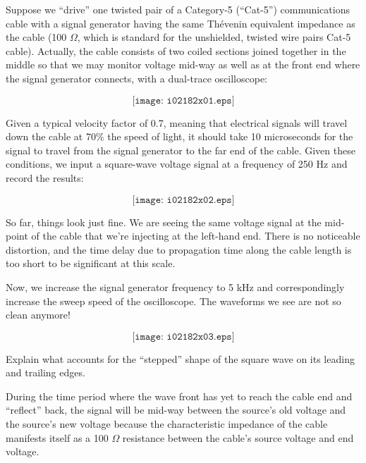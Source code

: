 

Suppose we ``drive'' one twisted pair of a Category-5 (``Cat-5'') communications cable with a signal generator having the same Th\'evenin equivalent impedance as the cable (100 $\Omega$, which is standard for the unshielded, twisted wire pairs Cat-5 cable).  Actually, the cable consists of two coiled sections joined together in the middle so that we may monitor voltage mid-way as well as at the front end where the signal generator connects, with a dual-trace oscilloscope:

$$\texttt{[image: i02182x01.eps]}$$

Given a typical velocity factor of 0.7, meaning that electrical signals will travel down the cable at 70\% the speed of light, it should take 10 microseconds for the signal to travel from the signal generator to the far end of the cable.  Given these conditions, we input a square-wave voltage signal at a frequency of 250 Hz and record the results:

$$\texttt{[image: i02182x02.eps]}$$

So far, things look just fine.  We are seeing the same voltage signal at the mid-point of the cable that we're injecting at the left-hand end.  There is no noticeable distortion, and the time delay due to propagation time along the cable length is too short to be significant at this scale.

\vskip 10pt

\filbreak

Now, we increase the signal generator frequency to 5 kHz and correspondingly increase the sweep speed of the oscilloscope.  The waveforms we see are not so clean anymore!

$$\texttt{[image: i02182x03.eps]}$$

Explain what accounts for the ``stepped'' shape of the square wave on its leading and trailing edges.







During the time period where the wave front has yet to reach the cable end and ``reflect'' back, the signal will be mid-way between the source's old voltage and the source's new voltage because the characteristic impedance of the cable manifests itself as a 100 $\Omega$ resistance between the cable's source voltage and end voltage.

